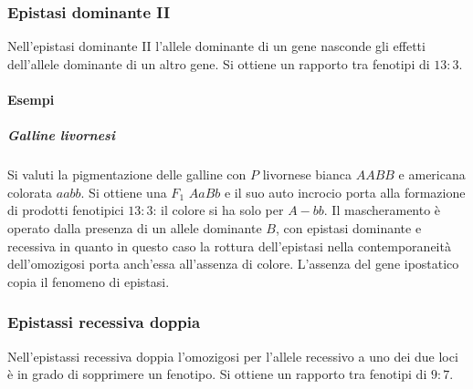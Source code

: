 \subsubsection{Epistasi dominante II}
Nell'epistasi dominante II l'allele dominante di un gene nasconde gli effetti dell'allele dominante di un altro gene. Si ottiene un rapporto tra fenotipi di $13:3$.
\paragraph{Esempi}
\subparagraph{Galline livornesi}
Si valuti la pigmentazione delle galline con $P$ livornese bianca $AABB$ e americana colorata $aabb$. Si ottiene una $F_1$ $AaBb$ e il suo auto incrocio porta alla formazione di 
prodotti fenotipici $13:3$: il colore si ha solo per $A-bb$. Il mascheramento \`e operato dalla presenza di un allele dominante $B$, con epistasi dominante e recessiva in quanto in questo caso la rottura 
dell'epistasi nella contemporaneit\`a dell'omozigosi porta anch'essa all'assenza di colore. L'assenza del gene ipostatico copia il fenomeno di epistasi. 
\subsubsection{Epistassi recessiva doppia}
Nell'epistassi recessiva doppia l'omozigosi per l'allele recessivo a uno dei due loci \`e in grado di sopprimere un fenotipo. Si ottiene un rapporto tra fenotipi di $9:7$.
